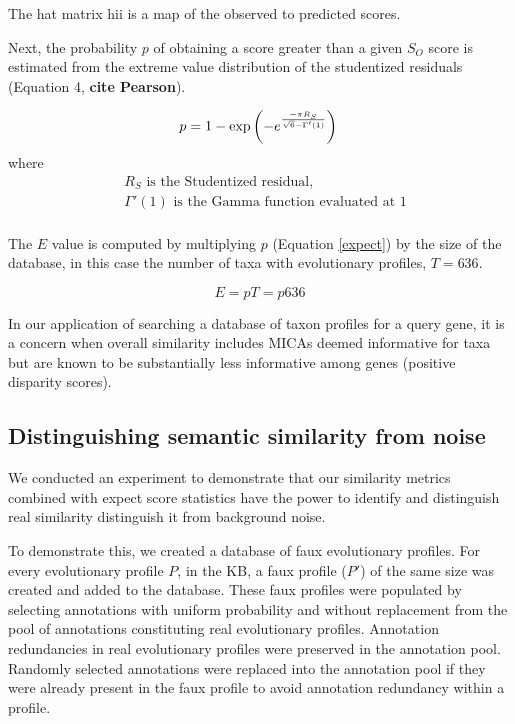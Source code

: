 \documentclass{article}
\begin{document}

The hat matrix hii is a map of the observed to predicted scores.

Next, the probability $p$ of obtaining a score greater than a given $S_O$ score is estimated from the extreme value distribution of the studentized residuals (Equation 4, \textbf{cite Pearson}).

\begin{equation}
\label{pvalue}
p=1-\exp \left( {-e^{\frac{-\pi R_S }{\sqrt{6} - \Gamma'(1)}}} \right) \\
\end{equation}
where 
\begin{align*}
& R_S \textrm{ is the Studentized residual,} \\
& \Gamma'(1) \textrm{ is the Gamma function evaluated at 1}
 \\
\end{align*}

The $E$ value is computed by multiplying $p$ (Equation \ref{expect}) by the size of the database, in this case the number of taxa with evolutionary profiles, $T=636$.

\begin{equation}
\label{expect}
E = pT = p636
\end{equation}


In our application of searching a database of taxon profiles for a query gene, it is a concern when overall similarity includes MICAs deemed informative for taxa but are known to be substantially less informative among genes (positive disparity scores).  %

\subsection{Distinguishing semantic similarity from noise}
We conducted an experiment to demonstrate that our similarity metrics combined with expect score statistics have the power to identify  and distinguish real similarity distinguish it from background noise. 

To demonstrate this, we created a database of faux evolutionary profiles. For every evolutionary profile $P$, in the KB, a faux profile ($P'$) of the same size was created and added to the database. These faux profiles were populated by selecting annotations with uniform probability and without replacement from the pool of annotations constituting real evolutionary profiles. Annotation redundancies in real evolutionary profiles were preserved in the annotation pool. Randomly selected annotations were replaced into the annotation pool if they were already present in the faux profile to avoid annotation redundancy within a profile. 
\end{document}
